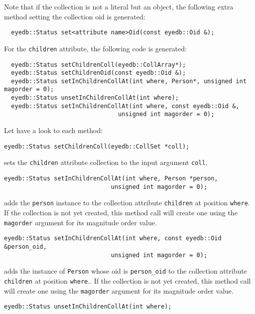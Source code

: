 Note that if the collection is not a literal but an object, the following
extra method setting the collection oid is generated:
\verbsize
\begin{verbatim}
  eyedb::Status set<attribute name>Oid(const eyedb::Oid &);
\end{verbatim}
\normalsize
For the \texttt{children} attribute, the following code is generated:
\verbsize
\begin{verbatim}
  eyedb::Status setChildrenColl(eyedb::CollArray*);
  eyedb::Status setChildrenOid(const eyedb::Oid &);
  eyedb::Status setInChildrenCollAt(int where, Person*, unsigned int magorder = 0);
  eyedb::Status unsetInChildrenCollAt(int where);
  eyedb::Status setInChildrenCollAt(int where, const eyedb::Oid &,
                                unsigned int magorder = 0);
\end{verbatim}
\normalsize
Let have a look to each method:
\be
\item
\verbsize
\begin{verbatim}
eyedb::Status setChildrenColl(eyedb::CollSet *coll);
\end{verbatim}
\normalsize
sets the \texttt{children} attribute collection to the input argument
\texttt{coll}.
\item
\verbsize
\begin{verbatim}
eyedb::Status setInChildrenCollAt(int where, Person *person,
                              unsigned int magorder = 0);
\end{verbatim}
\normalsize
adds the \texttt{person} instance to the collection attribute \texttt{children} at position \texttt{where}.
If the collection is not yet created, this method call will create one
using the \texttt{magorder} argument for its magnitude order value.
\item
\verbsize
\begin{verbatim}
eyedb::Status setInChildrenCollAt(int where, const eyedb::Oid &person_oid,
                              unsigned int magorder = 0);
\end{verbatim}
\normalsize
adds the instance of \texttt{Person} whose oid is \texttt{person\_oid}
to the collection attribute \texttt{children} at position \texttt{where}..
If the collection is not yet created, this method call will create one
using the \texttt{magorder} argument for its magnitude order value.
\item
\verbsize
\begin{verbatim}
eyedb::Status unsetInChildrenCollAt(int where);
\end{verbatim}
